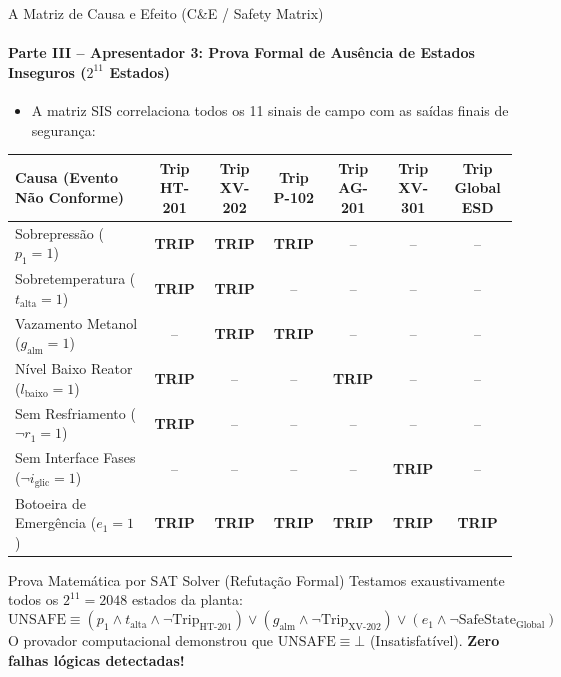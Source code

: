 \documentclass[aspectratio=169, 10pt]{beamer}
\begin{document}
\begin{frame}{A Matriz de Causa e Efeito (C\&E / Safety Matrix)}
  \framesubtitle{Parte III -- Apresentador 3: Prova Formal de Ausência de Estados Inseguros ($2^{11}$ Estados)}
  \begin{itemize}
    \item A matriz SIS correlaciona todos os 11 sinais de campo com as saídas finais de segurança:
  \end{itemize}

  \begin{table}[h]
    \centering
    \tiny
    \begin{tabular}{lcccccc}
      \toprule
      \textbf{Causa (Evento Não Conforme)} & \textbf{Trip HT-201} & \textbf{Trip XV-202} & \textbf{Trip P-102} & \textbf{Trip AG-201} & \textbf{Trip XV-301} & \textbf{Trip Global ESD} \\
      \midrule
      Sobrepressão ($p_1 = 1$) & \cellcolor{alertred!25}\textbf{TRIP} & \cellcolor{alertred!25}\textbf{TRIP} & \cellcolor{alertred!25}\textbf{TRIP} & -- & -- & -- \\
      Sobretemperatura ($t_{\text{alta}} = 1$) & \cellcolor{alertred!25}\textbf{TRIP} & \cellcolor{alertred!25}\textbf{TRIP} & -- & -- & -- & -- \\
      Vazamento Metanol ($g_{\text{alm}} = 1$) & -- & \cellcolor{alertred!25}\textbf{TRIP} & \cellcolor{alertred!25}\textbf{TRIP} & -- & -- & -- \\
      Nível Baixo Reator ($l_{\text{baixo}} = 1$) & \cellcolor{alertred!25}\textbf{TRIP} & -- & -- & \cellcolor{alertred!25}\textbf{TRIP} & -- & -- \\
      Sem Resfriamento ($\neg r_1 = 1$) & \cellcolor{alertred!25}\textbf{TRIP} & -- & -- & -- & -- & -- \\
      Sem Interface Fases ($\neg i_{\text{glic}} = 1$) & -- & -- & -- & -- & \cellcolor{alertred!25}\textbf{TRIP} & -- \\
      Botoeira de Emergência ($e_1 = 1$) & \cellcolor{alertred!25}\textbf{TRIP} & \cellcolor{alertred!25}\textbf{TRIP} & \cellcolor{alertred!25}\textbf{TRIP} & \cellcolor{alertred!25}\textbf{TRIP} & \cellcolor{alertred!25}\textbf{TRIP} & \cellcolor{alertred!25}\textbf{TRIP} \\
      \bottomrule
    \end{tabular}
  \end{table}

  \begin{exampleblock}{Prova Matemática por SAT Solver (Refutação Formal)}
    Testamos exaustivamente todos os $2^{11} = 2048$ estados da planta:
    $$\text{UNSAFE} \equiv (p_1 \land t_{\text{alta}} \land \neg \text{Trip}_{\text{HT-201}}) \lor (g_{\text{alm}} \land \neg \text{Trip}_{\text{XV-202}}) \lor (e_1 \land \neg \text{SafeState}_{\text{Global}})$$
    O provador computacional demonstrou que $\text{UNSAFE} \equiv \bot$ (Insatisfatível). \textbf{Zero falhas lógicas detectadas!}
  \end{exampleblock}
\end{frame}
\end{document}
